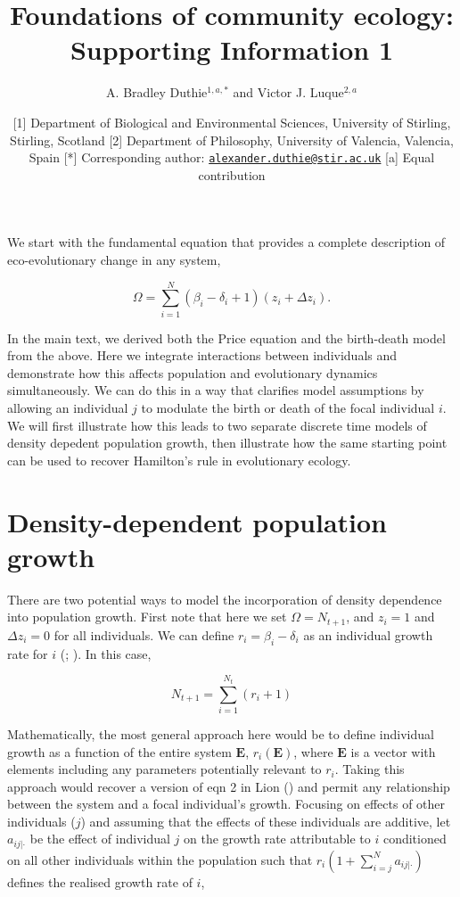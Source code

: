 \documentclass[
]{article}
\title{Foundations of community ecology: Supporting Information 1}
\author{A. Bradley Duthie\(^{1,a,*}\) and Victor J. Luque\(^{2,a}\)}
\date{{[}1{]} Department of Biological and Environmental Sciences,
University of Stirling, Stirling, Scotland {[}2{]} Department of
Philosophy, University of Valencia, Valencia, Spain {[}*{]}
Corresponding author:
\href{mailto:alexander.duthie@stir.ac.uk}{\nolinkurl{alexander.duthie@stir.ac.uk}}
{[}a{]} Equal contribution}
\begin{document}
\maketitle

We start with the fundamental equation that provides a complete
description of eco-evolutionary change in any system,

\[\Omega = \sum_{i=1}^{N} \left(\beta_{i} - \delta_{i} + 1 \right)\left(z_{i} + \Delta z_{i} \right).
\tag{1}
\]

In the main text, we derived both the Price equation and the birth-death
model from the above. Here we integrate interactions between individuals
and demonstrate how this affects population and evolutionary dynamics
simultaneously. We can do this in a way that clarifies model assumptions
by allowing an individual \(j\) to modulate the birth or death of the
focal individual \(i\). We will first illustrate how this leads to two
separate discrete time models of density depedent population growth,
then illustrate how the same starting point can be used to recover
Hamilton's rule in evolutionary ecology.

\section{Density-dependent population
growth}\label{density-dependent-population-growth}

There are two potential ways to model the incorporation of density
dependence into population growth. First note that here we set
\(\Omega = N_{t+1}\), and \(z_{i} = 1\) and \(\Delta z_{i} = 0\) for all
individuals. We can define \(r_{i} = \beta_{i} - \delta_{i}\) as an
individual growth rate for \(i\) (;
). In this case,

\[N_{t+1} = \sum_{i=1}^{N_{t}}\left(r_{i} + 1\right)
\tag{S1}
\]

Mathematically, the most general approach here would be to define
individual growth as a function of the entire system \(\mathbf{E}\),
\(r_{i}(\mathbf{E})\), where \(\mathbf{E}\) is a vector with elements
including any parameters potentially relevant to \(r_{i}\). Taking this
approach would recover a version of eqn 2 in Lion
() and permit any relationship between the
system and a focal individual's growth. Focusing on effects of other
individuals (\(j\)) and assuming that the effects of these individuals
are additive, let \(a_{ij|\cdot}\) be the effect of individual \(j\) on
the growth rate attributable to \(i\) conditioned on all other
individuals within the population such that
\(r_{i}\left(1 + \sum_{i = j}^{N}a_{ij|\cdot} \right)\) defines the
realised growth rate of \(i\),
\end{document}
